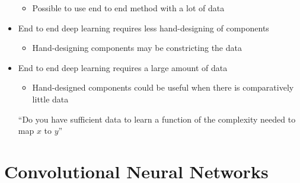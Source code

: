 \documentclass[12pt, letterpaper]{article}
\begin{document}
\begin{itemize}
\begin{itemize}
            \item Possible to use end to end method with a lot of data
        \end{itemize}
        \item End to end deep learning requires less hand-designing of components
        \begin{itemize}
            \item Hand-designing components may be constricting the data
        \end{itemize}
        \item End to end deep learning requires a large amount of data
        \begin{itemize}
            \item Hand-designed components could be useful when there is comparatively little data
        \end{itemize}
        \begin{center}
            ``Do you have sufficient data to learn a function of the complexity needed to map $x$ to $y$''
        \end{center}
    \end{itemize}
    \pagebreak

    \section{Convolutional Neural Networks}
\end{document}
